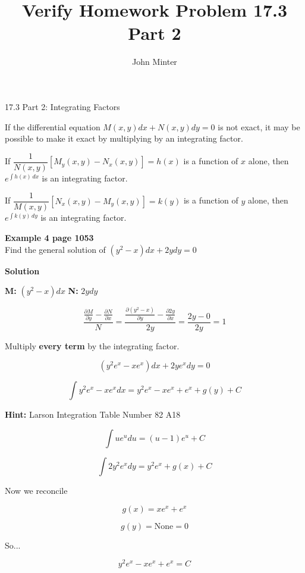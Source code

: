\documentclass[11pt]{article}
\title{Verify Homework Problem 17.3 Part 2}
\author{John Minter}
\begin{document}
\maketitle

\large{17.3 Part 2: Integrating Factors}

If the differential equation $M(x, y) dx + N(x, y)dy =0$ is not exact, it may be
possible to make it exact by multiplying by an integrating factor.

If $\dfrac{1}{N(x,y)}[M_y(x,y) - N_x(x,y)]=h(x)$ is a function of $x$ alone,
then $e^{\int h(x)\, dx}$ is an integrating factor.

If $\dfrac{1}{M(x,y)}[N_x(x,y) - M_y(x,y)]=k(y)$ is a function of $y$ alone, then $e^{\int k(y)\, dy}$ is an integrating factor.

\noindent\textbf{Example 4 page 1053}\\
Find the general solution of $(y^2-x)dx + 2ydy = 0$

\textbf{\Large{Solution}}

\Large{\textbf{M:}} $(y^2-x)dx$   \Large{\textbf{N:}} $2ydy$

$$\frac{\frac{\partial M}{\partial y} - \frac{\partial N}{\partial x}}{N} = \frac{\frac{\partial (y^2 - x)}{\partial y} -  \frac{\partial 2y}{\partial x}}{2y} = \frac{2y-0}{2y} = 1$$

\large{Multiply \textbf{every term} by the integrating factor. }

$$(y^2e^x - xe^x)dx + 2ye^xdy = 0$$

$$ \int y^2e^x -  xe^xdx = y^2e^x - xe^x + e^x + g(y) + C$$

\textbf{Hint:} Larson Integration Table Number 82 A18

$$\int ue^u du = (u-1)e^u + C $$

$$ \int 2y^2e^xdy = y^2e^x + g(x) + C$$

\large{Now we reconcile}


$$g(x) =  xe^x + e^x$$

$$g(y) =  \textrm{None} = 0$$

\large{So...}

$$y^2e^x - xe^x + e^x = C$$
\end{document}
